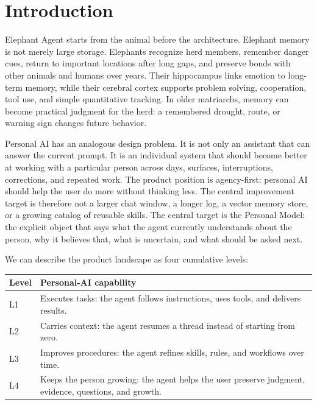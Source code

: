 \section{Introduction}
\label{sec:introduction}

Elephant Agent starts from the animal before the architecture. Elephant memory
is not merely large storage. Elephants recognize herd members, remember danger
cues, return to important locations after long gaps, and preserve bonds with
other animals and humans over years. Their hippocampus links emotion to
long-term memory, while their cerebral cortex supports problem solving,
cooperation, tool use, and simple quantitative tracking. In older matriarchs,
memory can become practical judgment for the herd: a remembered drought, route,
or warning sign changes future behavior.

Personal AI has an analogous design problem. It is not only an assistant that
can answer the current prompt. It is an individual system that should become
better at working with a particular person across days, surfaces,
interruptions, corrections, and repeated work. The product position is
agency-first: personal AI should help the user do more without thinking less.
The central improvement target is therefore not a larger chat window, a longer
log, a vector memory store, or a growing catalog of reusable skills. The central
target is the Personal Model: the explicit object that says what the agent
currently understands about the person, why it believes that, what is
uncertain, and what should be asked next.

We can describe the product landscape as four cumulative levels:

\begin{center}
\begin{tabularx}{0.98\linewidth}{@{}lX@{}}
\toprule
\textbf{Level} & \textbf{Personal-AI capability} \\
\midrule
L1 & Executes tasks: the agent follows instructions, uses tools, and delivers results. \\
L2 & Carries context: the agent resumes a thread instead of starting from zero. \\
L3 & Improves procedures: the agent refines skills, rules, and workflows over time. \\
L4 & Keeps the person growing: the agent helps the user preserve judgment, evidence, questions, and growth. \\
\bottomrule
\end{tabularx}
\end{center}

